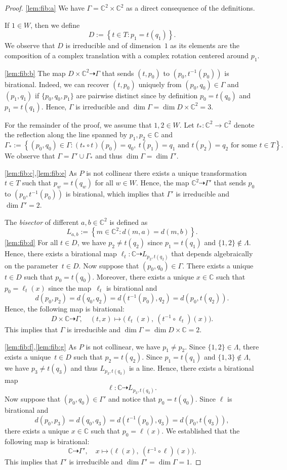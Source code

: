\documentclass[10pt,a4paper]{amsart}
\newcommand{\C}{{\mathbb{C}}}
\newcommand{\df}[1]{{\it #1}}
\newcommand{\dto}{\dasharrow}
\newcommand{\sd}{d} %
\newcommand{\set}[2]{\left\{#1:#2\right\}}
\newcommand{\st}{such that }
\renewcommand{\c}{\colon}
\begin{document}
\begin{proof}
\ref{lem:fib:a} We have $\Gamma=\C^2\times\C^2$ as a direct consequence of the definitions.

If $1\in W$, then we define
\[
D:=\set{t\in T}{p_1=t(q_1)}.
\]
We observe that $D$ is irreducible and of dimension~$1$ as its elements
are the composition of a complex translation with a complex
rotation centered around $p_1$.

\ref{lem:fib:b} The map $D\times\C^2\dto \Gamma$ that sends $(t,p_0)$ to $(p_0,t^{-1}(p_0))$
is birational.
Indeed, we can recover $(t,p_0)$ uniquely from $(p_0,q_0)\in \Gamma$ and $(p_1,q_1)$
if $\{p_0,q_0,p_1\}$ are pairwise distinct since by definition $p_0=t(q_0)$ and $p_1=t(q_1)$.
Hence, $\Gamma$ is irreducible and $\dim \Gamma=\dim D\times\C^2=3$.

For the remainder of the proof, we assume that $1,2\in W$.
Let
$t_*\c\C^2\to \C^2$ denote the reflection along the line spanned by $p_1,p_2\in\C$
and
\[
\Gamma_*:=\set{(p_0,q_0)\in \Gamma}{(t_*\circ t)(p_0)=q_0,~ t(p_1)=q_1 \text{ and } t(p_2)=q_2 \text{ for some }t\in T}.
\]
We observe that $\Gamma=\Gamma'\cup\Gamma_*$ and thus $\dim\Gamma=\dim \Gamma'$.

\ref{lem:fib:c},\ref{lem:fib:e}
As $P$ is not collinear there exists a unique transformation~$t\in T$ \st
$p_w=t(q_w)$ for all $w\in W$.
Hence, the map $\C^2\dto \Gamma'$ that sends $p_0$ to $(p_0,t^{-1}(p_0))$
is birational, which implies that $\Gamma'$ is irreducible and $\dim\Gamma'=2$.

The \df{bisector} of different $a,b\in\C^2$ is defined as
\[
L_{a,b}:=\set{m\in\C^2}{\sd(m,a)=\sd(m,b)}.
\]
\ref{lem:fib:d}
For all $t\in D$, we have $p_2\neq t(q_2)$ since $p_1=t(q_1)$
and $\{1,2\}\notin \Lambda$.
Hence, there exists a birational map $\ell_t\c \C\dto L_{p_2,t(q_2)}$
that depends algebraically on the parameter~$t\in D$.
Now suppose that $(p_0,q_0)\in\Gamma$.
There exists a unique $t\in D$ \st $p_0=t(q_0)$.
Moreover, there exists a unique $x\in \C$ \st $p_0=\ell_t(x)$ since
the map~$\ell_t$ is birational and
\[
\sd(p_0,p_2)=\sd(q_0,q_2)=\sd(t^{-1}(p_0),q_2)=\sd(p_0,t(q_2)).
\]
Hence, the following map is birational:
\[
D\times\C \dto \Gamma, \quad (t,x)\mapsto \bigl(\ell_t(x),~(t^{-1}\circ\ell_t)(x)\bigr).
\]
This implies that $\Gamma$ is irreducible and $\dim\Gamma=\dim D\times\C=2$.

\ref{lem:fib:f},\ref{lem:fib:g}
As $P$ is not collinear, we have $p_1\neq p_2$.
Since $\{1,2\}\in\Lambda$,
there exists a unique~$t\in D$ \st $p_2=t(q_2)$.
Since $p_1=t(q_1)$ and $\{1,3\}\notin \Lambda$,
we have $p_3\neq t(q_3)$ and thus $L_{p_3,t(q_3)}$ is a line.
Hence, there exists a birational map
\[
\ell\c \C\dto L_{p_3,t(q_3)}.
\]
Now suppose that $(p_0,q_0)\in\Gamma'$ and notice that $p_0=t(q_0)$.
Since $\ell$ is birational and
\[
\sd(p_0,p_3)=\sd(q_0,q_3)=\sd(t^{-1}(p_0),q_3)=\sd(p_0,t(q_3)),
\]
there exists a unique $x\in \C$ \st $p_0=\ell(x)$.
We established that the following map is birational:
\[
\C \dto \Gamma', \quad x\mapsto \bigl(\ell(x),~(t^{-1}\circ\ell)(x)\bigr).
\]
This implies that $\Gamma'$ is irreducible and
$\dim\Gamma'=\dim\Gamma=1$.


\end{proof}
\end{document}
